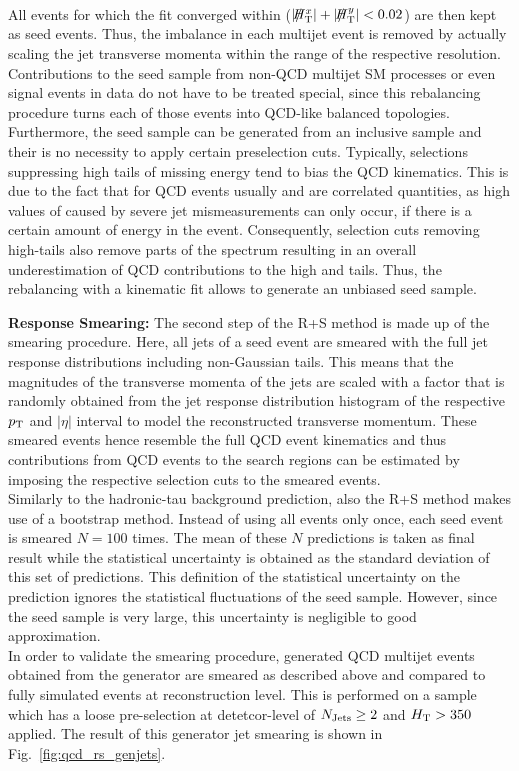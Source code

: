 \begin{description}
\\  
All events for which the fit converged within ($|\slash\mkern-12mu{H}_{\text{T}}^x| + |\slash\mkern-12mu{H}_{\text{T}}^y| < 0.02$) are then kept as seed events. Thus, the imbalance in each multijet event is removed by actually scaling the jet transverse momenta within the range of the respective resolution. Contributions to the seed sample from non-QCD multijet SM processes or even signal events in data do not have to be treated special, since this rebalancing procedure turns each of those events into QCD-like balanced topologies. Furthermore, the seed sample can be generated from an inclusive sample and their is no necessity to apply certain preselection cuts. Typically, selections suppressing high tails of missing energy tend to bias the QCD kinematics. This is due to the fact that for QCD events usually \HT and \MHT are correlated quantities, as high values of \MHT caused by severe jet mismeasurements can only occur, if there is a certain amount of energy in the event. Consequently, selection cuts removing high-\MHT tails also remove parts of the \HT spectrum resulting in an overall underestimation of QCD contributions to the high \HT and \MHT tails. Thus, the rebalancing with a kinematic fit allows to generate an unbiased seed sample.  

 \item \textbf{Response Smearing:}
The second step of the R+S method is made up of the smearing procedure. Here, all jets of a seed event are smeared with the full jet response distributions including non-Gaussian tails. This means that the magnitudes of the transverse momenta of the jets are scaled with a factor that is randomly obtained from the jet response distribution histogram of the respective $p_{\text{T}}$ and $|\eta|$ interval to model the reconstructed transverse momentum. These smeared events hence resemble the full QCD event kinematics and thus contributions from QCD events to the search regions can be estimated by imposing the respective selection cuts to the smeared events. \\
Similarly to the hadronic-tau background prediction, also the R+S method makes use of a bootstrap method. Instead of using all events only once, each seed event is smeared $N = 100$ times. The mean of these $N$ predictions is taken as final result while the statistical uncertainty is obtained as the standard deviation of this set of predictions. This definition of the statistical uncertainty on the prediction ignores the statistical fluctuations of the seed sample. However, since the seed sample is very large, this uncertainty is negligible to good approximation. \\
In order to validate the smearing procedure, generated QCD multijet events obtained from the \madgraph generator are smeared as described above and compared to fully simulated events at reconstruction level. This is performed on a sample which has a loose pre-selection at detetcor-level of $N_{\text{Jets}} \ge 2$ and $H_{\text{T}} > 350$\gev applied. The result of this generator jet smearing is shown in Fig.~\ref{fig:qcd_rs_genjets}. 
\begin{figure}[!t]
  \centering


\end{figure}
\end{description}
